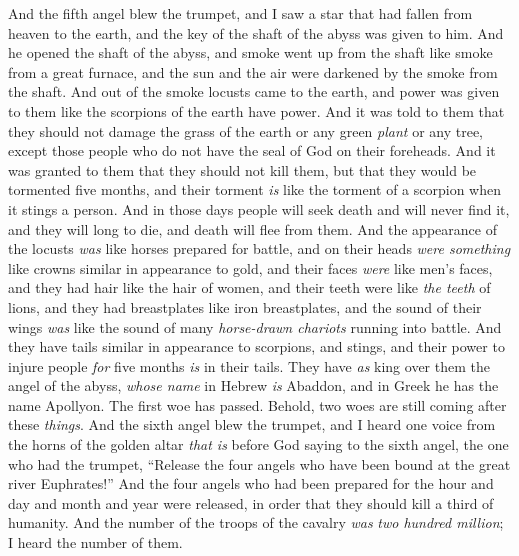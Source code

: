 \begin{biblechapter} %
 And the fifth angel blew the trumpet, and I saw a star that had fallen from heaven to the earth, and the key of the shaft of the abyss was given to him.
\verse And he opened the shaft of the abyss, and smoke went up from the shaft like smoke from a great furnace, and the sun and the air were darkened by the smoke from the shaft.
\verse And out of the smoke locusts came to the earth, and power was given to them like the scorpions of the earth have power.
\verse And it was told to them that they should not damage the grass of the earth or any green \textit{plant} or any tree, except those people who do not have the seal of God on their foreheads.
\verse And it was granted to them that they should not kill them, but that they would be tormented five months, and their torment \textit{is} like the torment of a scorpion when it stings a person.
\verse And in those days people will seek death and will never find it, and they will long to die, and death will flee from them.
\verse And the appearance of the locusts \textit{was} like horses prepared for battle, and on their heads \textit{were something} like crowns similar in appearance to gold, and their faces \textit{were} like men’s faces,
\verse and they had hair like the hair of women, and their teeth were like \textit{the teeth} of lions,
\verse and they had breastplates like iron breastplates, and the sound of their wings \textit{was} like the sound of many \textit{horse-drawn chariots} running into battle.
\verse And they have tails similar in appearance to scorpions, and stings, and their power to injure people \textit{for} five months \textit{is} in their tails.
\verse They have \textit{as} king over them the angel of the abyss, \textit{whose name} in Hebrew \textit{is} Abaddon, and in Greek he has the name Apollyon.
\verse The first woe has passed. Behold, two woes are still coming after these \textit{things}.
 And the sixth angel blew the trumpet, and I heard one voice from the horns of the golden altar \textit{that is} before God
\verse saying to the sixth angel, the one who had the trumpet, “Release the four angels who have been bound at the great river Euphrates!”
\verse And the four angels who had been prepared for the hour and day and month and year were released, in order that they should kill a third of humanity.
\verse And the number of the troops of the cavalry \textit{was} \textit{two hundred million}; I heard the number of them.

\end{biblechapter}
